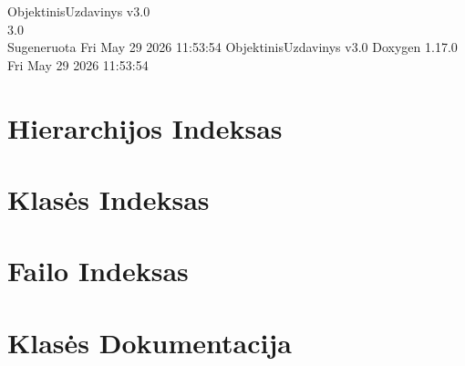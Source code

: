 \documentclass[twoside]{book}
\newcommand{\+}{\discretionary{\mbox{\scriptsize$\hookleftarrow$}}{}{}}
\newcommand{\clearemptydoublepage}{%
    \newpage{\pagestyle{empty}\cleardoublepage}%
  }
\begin{document}
  \raggedbottom
    \hypersetup{pageanchor=false,
                bookmarksnumbered=true,
                pdfencoding=unicode
               }
  \begin{titlepage}
  \vspace*{7cm}
  \begin{center}%
  {\Large Objektinis\+Uzdavinys v3.\+0}\\
  [1ex]\large 3.\+0 \\
  \vspace*{1cm}
  {\large Sugeneruota Fri May 29 2026 11:\+53:\+54 Objektinis\+Uzdavinys v3.\+0  Doxygen 1.17.0}\\
    \vspace*{0.5cm}
    {\small Fri May 29 2026 11:53:54}
  \end{center}
  \end{titlepage}
  \clearemptydoublepage
  \tableofcontents
  \clearemptydoublepage
  \hypersetup{pageanchor=true}

\chapter{Hierarchijos Indeksas}

\chapter{Klasės Indeksas}

\chapter{Failo Indeksas}

\chapter{Klasės Dokumentacija}

































\end{document}
